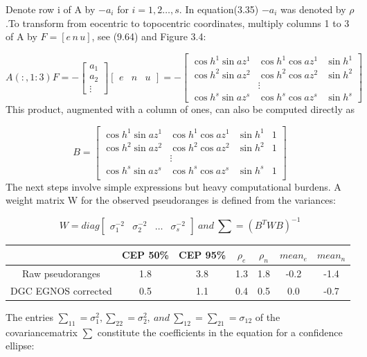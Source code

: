 		Denote row i of A by $-a_i$ for $i = 1,2\ldots,s.$ In equation(3.35) $-a_i$ was denoted by $\rho$.To transform from eocentric to topocentric coordinates, multiply columns 1 to 3 of A by $F = [ e\,n\,u ]$, see (9.64) and Figure 3.4:
		
		\begin{equation*}
			A(:,1:3)F = -
			\begin{bmatrix}
				a_1 \\ a_2 \\ \vdots
			\end{bmatrix}
			\begin{bmatrix}
				e & n & u
			\end{bmatrix} = -
			\begin{bmatrix}
				\cos h^1 \sin az^1 & \cos h^1 \cos az^1 & \sin h^1 \\
				\cos h^2 \sin az^2 & \cos h^2 \cos az^2 & \sin h^2 \\
                & \vdots & \\
				\cos h^s \sin az^s & \cos h^s \cos az^s & \sin h^s 
			\end{bmatrix}
		\end{equation*}
        This product, augmented with a column of ones, can also be computed directly as
		
		\begin{equation}\label{eq:9.72}
			B = \begin{bmatrix}
				\cos h^1 \sin az^1 & \cos h^1 \cos az^1 & \sin h^1 & 1 \\
				\cos h^2 \sin az^2 & \cos h^2 \cos az^2 & \sin h^2 & 1 \\
                & \vdots & & \\
				\cos h^s \sin az^s & \cos h^s \cos az^s & \sin h^s & 1 \\
			\end{bmatrix}
		\end{equation}
		The next steps involve simple expressions but heavy computational burdens. A weight matrix W for the observed pseudoranges is defined from the variances:
		
		\begin{equation}\label{eq:9.73}
			W = diag \begin{bmatrix}
			\sigma^{-2}_{1} & \sigma^{-2}_2 & \ldots & \sigma^{-2}_s
			\end{bmatrix}\: and \: \sum = (B^TWB)^{-1}
		\end{equation}
		\begin{tabular}{ccccccc}
			\hline 
			& CEP 50\% & CEP 95\% & $\rho_e$ & $\rho_n$ & $mean_e$ & $mean_n$ \\ 
			\hline 
			Raw pseudoranges & 1.8 & 3.8 & 1.3 & 1.8 & -0.2 & -1.4 \\ 
			DGC EGNOS corrected & 0.5 & 1.1 & 0.4 & 0.5 & 0.0 & -0.7 \\ 
			\hline 
		\end{tabular} 
		The entries $\sum_{11} = \sigma^2_1, \sum_{22} = \sigma^2_2,\: and \: \sum_{12} = \sum_{21} = \sigma_{12} $ of the covariancematrix $\sum$ constitute the coefficients in the equation for a confidence ellipse:
		
